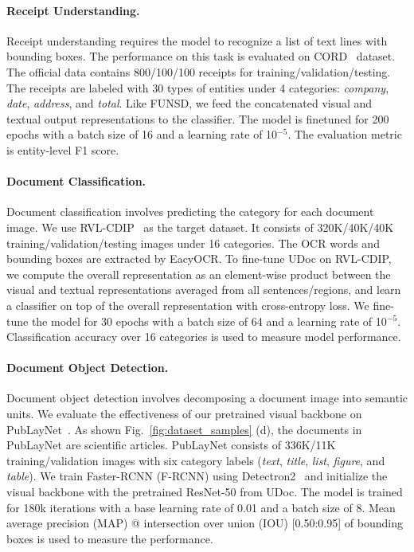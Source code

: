 \documentclass{article}
\begin{document}
	\paragraph{Receipt Understanding.}
	Receipt understanding requires the model {to} recognize a list of text lines with bounding boxes.
	{The performance on this task is evaluated} on CORD~\cite{park2019cord} dataset. The official data contains 800/100/100 receipts for training/validation/testing. {The receipts are} labeled with 30 types of entities under 4 categories: \textit{company}, \textit{date}, \textit{address}, and \textit{total}. Like FUNSD, we feed the concatenated visual and textual output representation{s} to the classifier. The model is finetuned for 200 epochs with a batch size of 16 and a learning rate of 10$^{-5}$. The evaluation metric is entity-level F1 score.
	
	\paragraph{Document Classification.}
	Document classification {involves predicting} the category for each document image.
	We use RVL-CDIP~\cite{harley2015icdar} as the target dataset. It consists of 320K/40K/40K training/validation/testing images {under} {16 categories}. The OCR words and bounding boxes are extracted by EacyOCR. To fine-tune UDoc on RVL-CDIP, we compute the overall representation as an element-wise product between {the} visual and textual representations {averaged from all sentences/regions}, and learn a classifier {on top of the overall representation} with cross-entropy loss. 
	We fine-tune the model for 30 epochs with a batch size of 64 and a learning rate of 10$^{-5}$. Classification accuracy over 16 {categories} is used to measure model performance.
	
	\paragraph{Document {Object} Detection.}
	Document object detection {involves decomposing} a document image into semantic units. We evaluate the effectiveness of {our} pretrained visual backbone on PubLayNet~\cite{zhong2019publaynet}. As shown Fig.~\ref{fig:dataset_samples} (d), the documents in PubLayNet are scientific articles. PubLayNet consists of 336K/11K training/validation images with six category {labels} (\textit{text}, \textit{title}, \textit{list}, \textit{figure}, and \textit{table}).
	We train Faster-RCNN (F-RCNN) using Detectron2~\cite{wu2019detectron2} and initialize the visual backbone with the pretrained ResNet-50 from UDoc.
	The model is trained for 180k iterations with a base learning rate of 0.01 and a batch size of 8. Mean average precision (MAP) @ intersection over union (IOU) [0.50:0.95] of bounding boxes is used to measure the performance.
	
\end{document}
